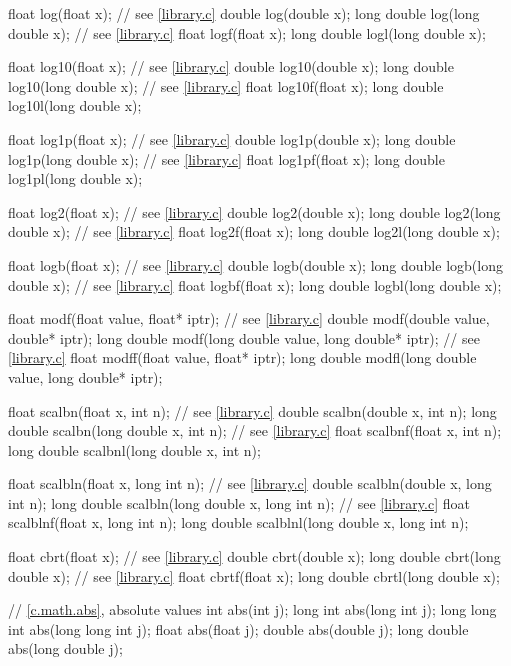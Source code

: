 \begin{codeblock}
{  float log(float x);                   // see \ref{library.c}
  double log(double x);
  long double log(long double x);       // see \ref{library.c}
  float logf(float x);
  long double logl(long double x);

  float log10(float x);                 // see \ref{library.c}
  double log10(double x);
  long double log10(long double x);     // see \ref{library.c}
  float log10f(float x);
  long double log10l(long double x);

  float log1p(float x);                 // see \ref{library.c}
  double log1p(double x);
  long double log1p(long double x);     // see \ref{library.c}
  float log1pf(float x);
  long double log1pl(long double x);

  float log2(float x);                  // see \ref{library.c}
  double log2(double x);
  long double log2(long double x);      // see \ref{library.c}
  float log2f(float x);
  long double log2l(long double x);

  float logb(float x);                  // see \ref{library.c}
  double logb(double x);
  long double logb(long double x);      // see \ref{library.c}
  float logbf(float x);
  long double logbl(long double x);

  float modf(float value, float* iptr); // see \ref{library.c}
  double modf(double value, double* iptr);
  long double modf(long double value, long double* iptr);   // see \ref{library.c}
  float modff(float value, float* iptr);
  long double modfl(long double value, long double* iptr);

  float scalbn(float x, int n);         // see \ref{library.c}
  double scalbn(double x, int n);
  long double scalbn(long double x, int n);     // see \ref{library.c}
  float scalbnf(float x, int n);
  long double scalbnl(long double x, int n);

  float scalbln(float x, long int n);   // see \ref{library.c}
  double scalbln(double x, long int n);
  long double scalbln(long double x, long int n);   // see \ref{library.c}
  float scalblnf(float x, long int n);
  long double scalblnl(long double x, long int n);

  float cbrt(float x);                  // see \ref{library.c}
  double cbrt(double x);
  long double cbrt(long double x);      // see \ref{library.c}
  float cbrtf(float x);
  long double cbrtl(long double x);

  // \ref{c.math.abs}, absolute values
  int abs(int j);
  long int abs(long int j);
  long long int abs(long long int j);
  float abs(float j);
  double abs(double j);
  long double abs(long double j);

}
\end{codeblock}
